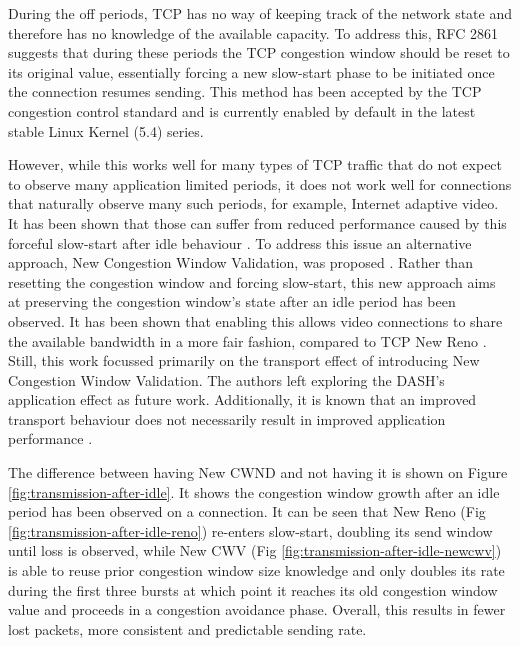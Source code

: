 \documentclass[10pt,sigconf]{acmart}
\begin{document}
During the off periods, TCP has no way of keeping track of the network state and therefore has no knowledge of the available capacity. To address this, RFC 2861 \cite{rfc2861-2000-padhye-congestion-window-validation} suggests that during these periods the TCP congestion window should be reset to its original value, essentially forcing a new slow-start phase to be initiated once the connection resumes sending. This method has been accepted by the TCP congestion control standard \cite{rfc5681-congeston-control} and is currently enabled by default in the latest stable Linux Kernel (5.4) series.

However, while this works well for many types of TCP traffic that do not expect to observe many application limited periods, it does not work well for connections that naturally observe many such periods, for example, Internet adaptive video. It has been shown that those can suffer from reduced performance caused by this forceful slow-start after idle behaviour \cite{Esteban-2012-Interactions-HTTP-TCP}. To address this issue an alternative approach, New Congestion Window Validation, was proposed \cite{rfc7661-2015-fairhurst-new-cwnd-validation}. Rather than resetting the congestion window and forcing slow-start, this new approach aims at preserving the congestion window's state after an idle period has been observed. It has been shown that enabling this allows video connections to share the available bandwidth in a more fair fashion, compared to TCP New Reno \cite{Nazir-2014-performance-evaluation-congestion-window-validation-dash-newcwv}. Still, this work focussed primarily on the transport effect of introducing New Congestion Window Validation. The authors left exploring the DASH's application effect as future work. Additionally, it is known that an improved transport behaviour does not necessarily result in improved application performance \cite{Spiteri-2016-BOLA}.

The difference between having New CWND and not having it is shown on Figure \ref{fig:transmission-after-idle}. It shows the congestion window growth after an idle period has been observed on a connection. It can be seen that New Reno (Fig \ref{fig:transmission-after-idle-reno}) re-enters slow-start, doubling its send window until loss is observed, while New CWV (Fig \ref{fig:transmission-after-idle-newcwv}) is able to reuse prior congestion window size knowledge and only doubles its rate during the first three bursts at which point it reaches its old congestion window value and proceeds in a congestion avoidance phase. Overall, this results in fewer lost packets, more consistent and predictable sending rate.
\end{document}
